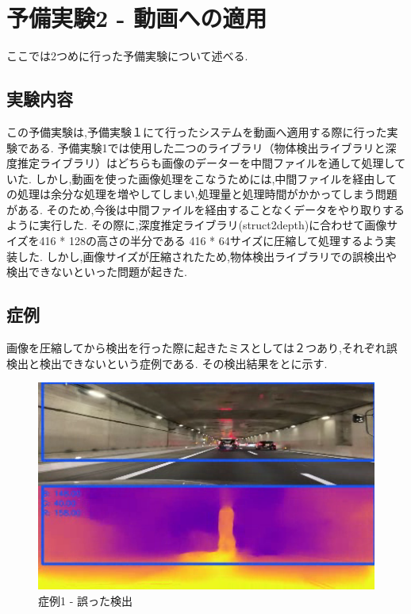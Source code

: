 \newpage
\section{予備実験2 - 動画への適用}
ここでは2つめに行った予備実験について述べる.
\subsection{実験内容}
この予備実験は,予備実験１にて行ったシステムを動画へ適用する際に行った実験である.
予備実験1では使用した二つのライブラリ（物体検出ライブラリと深度推定ライブラリ）はどちらも画像のデーターを中間ファイルを通して処理していた.
しかし,動画を使った画像処理をこなうためには,中間ファイルを経由しての処理は余分な処理を増やしてしまい,処理量と処理時間がかかってしまう問題がある.
そのため,今後は中間ファイルを経由することなくデータをやり取りするように実行した.
その際に,深度推定ライブラリ(struct2depth)に合わせて画像サイズを416 * 128の高さの半分である 416 * 64サイズに圧縮して処理するよう実装した.
しかし,画像サイズが圧縮されたため,物体検出ライブラリでの誤検出や検出できないといった問題が起きた.

\subsection{症例}
画像を圧縮してから検出を行った際に起きたミスとしては２つあり,それぞれ誤検出と検出できないという症例である.
その検出結果をとに示す.

\newpage
\begin{figure}[htbp]
  \begin{center}
   \includegraphics[width=12cm]{figs/miss_1.png}
  \end{center}
  \caption{症例1 - 誤った検出}
  \label{fig:miss1}
\end{figure}

